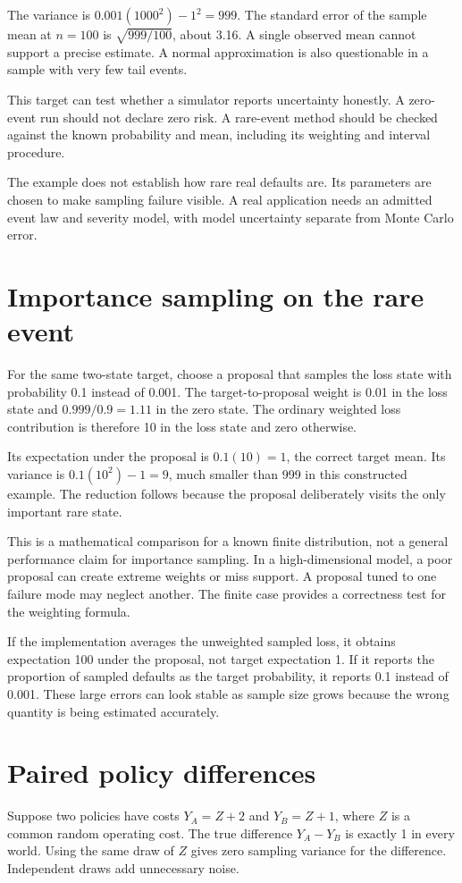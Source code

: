 The variance is $0.001(1000^2)-1^2=999$. The standard error of the sample mean at $n=100$ is $\sqrt{999/100}$, about 3.16. A single observed mean cannot support a precise estimate. A normal approximation is also questionable in a sample with very few tail events.

This target can test whether a simulator reports uncertainty honestly. A zero-event run should not declare zero risk. A rare-event method should be checked against the known probability and mean, including its weighting and interval procedure.

The example does not establish how rare real defaults are. Its parameters are chosen to make sampling failure visible. A real application needs an admitted event law and severity model, with model uncertainty separate from Monte Carlo error.

\section{Importance sampling on the rare event}
For the same two-state target, choose a proposal that samples the loss state with probability 0.1 instead of 0.001. The target-to-proposal weight is 0.01 in the loss state and $0.999/0.9=1.11$ in the zero state. The ordinary weighted loss contribution is therefore 10 in the loss state and zero otherwise.

Its expectation under the proposal is $0.1(10)=1$, the correct target mean. Its variance is $0.1(10^2)-1=9$, much smaller than 999 in this constructed example. The reduction follows because the proposal deliberately visits the only important rare state.

This is a mathematical comparison for a known finite distribution, not a general performance claim for importance sampling. In a high-dimensional model, a poor proposal can create extreme weights or miss support. A proposal tuned to one failure mode may neglect another. The finite case provides a correctness test for the weighting formula.

If the implementation averages the unweighted sampled loss, it obtains expectation 100 under the proposal, not target expectation 1. If it reports the proportion of sampled defaults as the target probability, it reports 0.1 instead of 0.001. These large errors can look stable as sample size grows because the wrong quantity is being estimated accurately.

\section{Paired policy differences}
Suppose two policies have costs $Y_A=Z+2$ and $Y_B=Z+1$, where $Z$ is a common random operating cost. The true difference $Y_A-Y_B$ is exactly 1 in every world. Using the same draw of $Z$ gives zero sampling variance for the difference. Independent draws add unnecessary noise.

